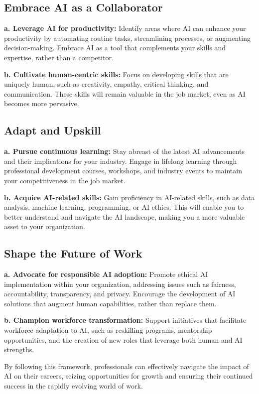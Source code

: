 \subsection{Embrace AI as a Collaborator}

\textbf{a. Leverage AI for productivity:} Identify areas where AI can enhance your productivity by automating routine tasks, streamlining processes, or augmenting decision-making. Embrace AI as a tool that complements your skills and expertise, rather than a competitor.

\textbf{b. Cultivate human-centric skills:} Focus on developing skills that are uniquely human, such as creativity, empathy, critical thinking, and communication. These skills will remain valuable in the job market, even as AI becomes more pervasive.

\subsection{Adapt and Upskill}

\textbf{a. Pursue continuous learning:} Stay abreast of the latest AI advancements and their implications for your industry. Engage in lifelong learning through professional development courses, workshops, and industry events to maintain your competitiveness in the job market.

\textbf{b. Acquire AI-related skills:} Gain proficiency in AI-related skills, such as data analysis, machine learning, programming, or AI ethics. This will enable you to better understand and navigate the AI landscape, making you a more valuable asset to your organization.

\subsection{Shape the Future of Work}

\textbf{a. Advocate for responsible AI adoption:} Promote ethical AI implementation within your organization, addressing issues such as fairness, accountability, transparency, and privacy. Encourage the development of AI solutions that augment human capabilities, rather than replace them.

\textbf{b. Champion workforce transformation:} Support initiatives that facilitate workforce adaptation to AI, such as reskilling programs, mentorship opportunities, and the creation of new roles that leverage both human and AI strengths.

By following this framework, professionals can effectively navigate the impact of AI on their careers, seizing opportunities for growth and ensuring their continued success in the rapidly evolving world of work.

